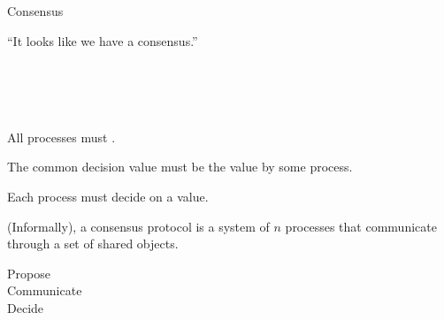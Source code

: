 \begin{frame}{}
  \centerline{\LARGE Consensus}

  \vspace{0.50cm}

  \vspace{-0.30cm} 
  \centerline{``It looks like we have a consensus.''}　
\end{frame}


\begin{frame}{}
  \begin{columns}
      \centerline{\qquad\qquad \Large \bf {}}
      \centerline{\Large \bf {}\qquad\qquad}
  \end{columns}

  \pause
  \vspace{0.50cm}
  \begin{definition}
    \begin{description}
      \setlength{\itemsep}{5pt}
      \item[Agreement] All  processes must .
      \item[Validity] The common decision value must be the value  by some process.
      \item[Termination] Each  process must  decide on a value.
    \end{description}
  \end{definition}
\end{frame}

\begin{frame}{}
  \begin{definition}
    (Informally), a consensus protocol is a system of $n$ processes
    that communicate through a set of shared objects.

    \begin{description}
      \item[Propose]
      \item[Communicate] 
      \item[Decide] 
    \end{description}
  \end{definition}
\end{frame}

